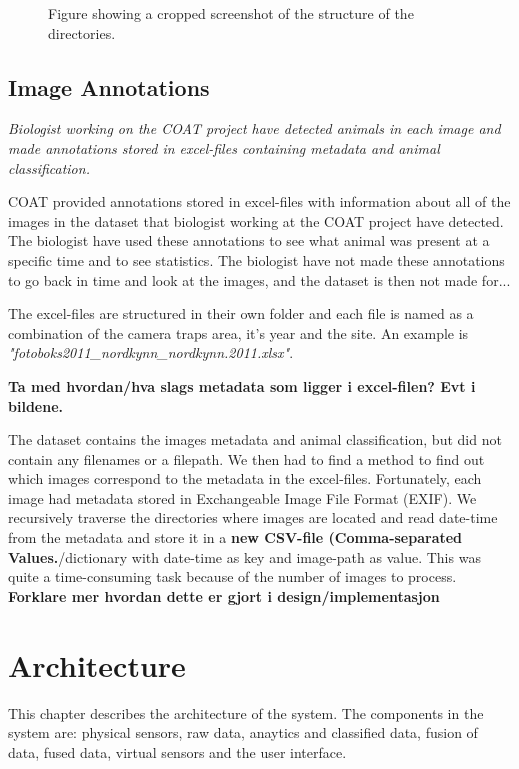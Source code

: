 \documentclass[USenglish]{uit-thesis}
\begin{document}
\begin{figure}
\caption{Figure showing a cropped screenshot of the structure of the directories.}
\label{fig:directories}
\end{figure}

\section{Image Annotations}
\textit{Biologist working on the COAT project have detected animals in each image and made annotations stored in excel-files containing metadata and animal classification.}

COAT provided annotations stored in excel-files with information about all of the images in the dataset that biologist working at the COAT project have detected. The biologist have used these annotations to see what animal was present at a specific time and to see statistics. The biologist have not made these annotations to go back in time and look at the images, and the dataset is then not made for...

 
The excel-files are structured in their own folder and each file is named as a combination of the camera traps area, it's year and the site. An example is \textit{"fotoboks2011\_nordkynn\_nordkynn.2011.xlsx"}.

\textbf{Ta med hvordan/hva slags metadata som ligger i excel-filen? Evt i bildene.}

The dataset contains the images metadata and animal classification, but did not contain any filenames or a filepath. We then had to find a method to find out which images correspond to the metadata in the excel-files. Fortunately, each image had metadata stored in Exchangeable Image File Format (EXIF). We recursively traverse the directories where images are located and read date-time from the metadata and store it in a \textbf{new CSV-file (Comma-separated Values.}/dictionary with date-time as key and image-path as value. This was quite a time-consuming task because of the number of images to process.
\textbf{Forklare mer hvordan dette er gjort i design/implementasjon}




\chapter{Architecture}
This chapter describes the architecture of the system.
The components in the system are: physical sensors, raw data, anaytics and classified data, fusion of data, fused data, virtual sensors and the user interface. 
\end{document}
